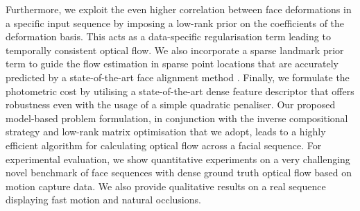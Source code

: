 Furthermore, we exploit the even higher correlation between face deformations in 
a specific input sequence by imposing a low-rank prior on the coefficients of the 
deformation basis. This acts as a data-specific regularisation term leading to 
temporally consistent optical flow.
We also incorporate a sparse landmark prior term to guide the flow estimation in sparse 
point locations that are accurately predicted by a state-of-the-art face 
alignment method \cite{kazemi2014one}.
Finally, we formulate the photometric cost by utilising a state-of-the-art dense 
feature descriptor that offers robustness even with the usage of a simple quadratic 
penaliser.
Our proposed model-based problem formulation, in conjunction with the inverse 
compositional strategy and low-rank matrix optimisation that we adopt, leads to a 
highly efficient algorithm for calculating optical flow across a facial sequence.
For experimental evaluation, we show quantitative experiments on a very challenging 
novel benchmark of face sequences with dense ground truth optical flow based on motion 
capture data. We also provide qualitative results on a real sequence displaying
fast motion and natural occlusions.

%
%





%
%
%

